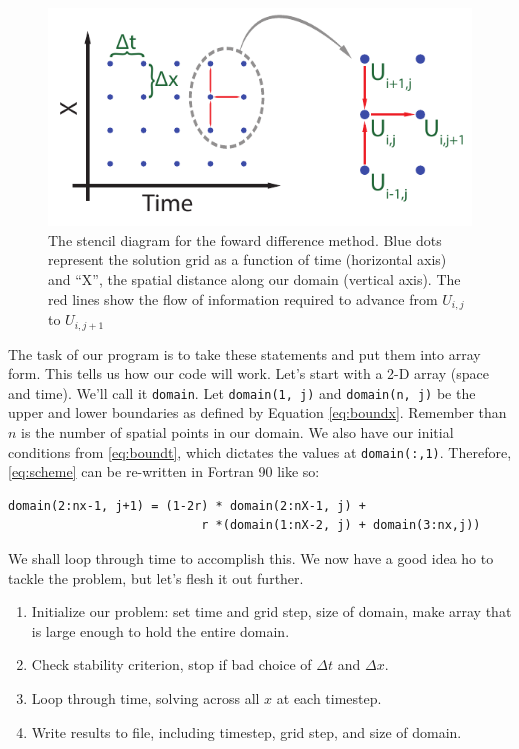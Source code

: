 \documentclass[11pt, letterpaper]{article}
\begin{document}
\begin{figure}[ht!]
  \centering
  \includegraphics{./heateq_fwddiff.pdf}
  \caption{The stencil diagram for the foward difference method.  Blue dots
    represent the solution grid as a function of time (horizontal axis)
    and ``X'', the
    spatial distance along our domain (vertical axis).  The red lines show
    the flow of information required to advance from $U_{i,j}$ to $U_{i,j+1}$}  
  \label{fig:sten}
\end{figure}


The task of our program is to take these statements and put them into array form.
This tells us how our code will work.  Let's start with a 2-D array (space and
time).  We'll call it {\tt domain}.  Let {\tt domain(1, j)} and
{\tt domain(n, j)} be the upper and lower boundaries as defined by
Equation \ref{eq:boundx}.  Remember than $n$ is the number of spatial points in
our domain.  We also have our initial conditions from \ref{eq:boundt}, which
dictates the values at {\tt domain(:,1)}.  Therefore, \ref{eq:scheme} can
be re-written in Fortran 90 like so:

\begin{verbatim}
domain(2:nx-1, j+1) = (1-2r) * domain(2:nX-1, j) + 
                           r *(domain(1:nX-2, j) + domain(3:nx,j))
\end{verbatim}

We shall loop through time to accomplish this.  We now have a good idea ho to
tackle the problem, but let's flesh it out further.

\begin{enumerate}
\item Initialize our problem: set time and grid step, size of domain, make
  array that is large enough to hold the entire domain.
\item Check stability criterion, stop if bad choice of $\Delta t$ and $\Delta x$.
\item Loop through time, solving across all $x$ at each timestep.
\item Write results to file, including timestep, grid step, and size of domain.
\end{enumerate}
\end{document}
